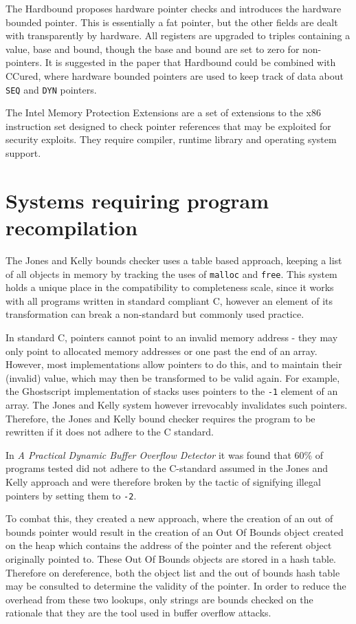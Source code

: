 The Hardbound \cite{devietti2008hardbound} proposes hardware pointer checks and introduces the hardware bounded pointer. This is essentially a fat pointer, but the other fields are dealt with transparently by hardware.
All registers are upgraded to triples containing a value, base and bound, though the base and bound are set to zero for non-pointers.
It is suggested in the paper that Hardbound could be combined with CCured, where hardware bounded pointers are used to keep track of data about \verb!SEQ! and \verb!DYN! pointers.

The Intel Memory Protection Extensions \cite{mpx,intelMpxSpec} are a set of extensions to the x86 instruction set designed to check pointer references that may be exploited for security exploits.
They require compiler, runtime library and operating system support.

\section{Systems requiring program recompilation}

The Jones and Kelly bounds checker \cite{jones1997backwards} uses a table based approach, keeping a list of all objects in memory by tracking the uses of \verb!malloc! and \verb!free!.
This system holds a unique place in the compatibility to completeness scale, since it works with all programs written in standard compliant C, however an element of its transformation can break a non-standard but commonly used practice.

In standard C, pointers cannot point to an invalid memory address - they may only point to allocated memory addresses or one past the end of an array.
However, most implementations allow pointers to do this, and to maintain their (invalid) value, which may then be transformed to be valid again.
For example, the Ghostscript implementation of stacks uses pointers to the \verb!-1! element of an array.
The Jones and Kelly system however irrevocably invalidates such pointers.
Therefore, the Jones and Kelly bound checker requires the program to be rewritten if it does not adhere to the C standard.

In \textit{A Practical Dynamic Buffer Overflow Detector} \cite{ruwase2004practical} it was found that 60\% of programs tested did not adhere to the C-standard assumed in the Jones and Kelly approach and were therefore broken by the tactic of signifying illegal pointers by setting them to \verb!-2!.

To combat this, they created a new approach, where the creation of an out of bounds pointer would result in the creation of an Out Of Bounds object created on the heap which contains the address of the pointer and the referent object originally pointed to.
These Out Of Bounds objects are stored in a hash table.
Therefore on dereference, both the object list and the out of bounds hash table may be consulted to determine the validity of the pointer.
In order to reduce the overhead from these two lookups, only strings are bounds checked on the rationale that they are the tool used in buffer overflow attacks.

